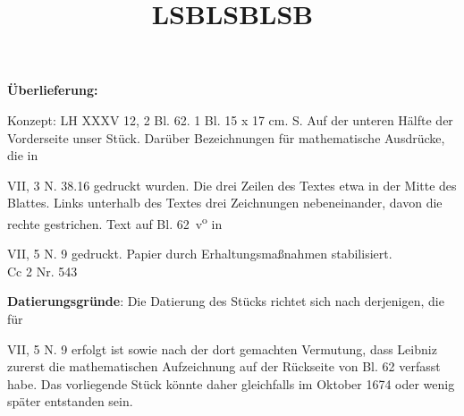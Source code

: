       
               
                \begin{ledgroupsized}[r]{120mm}
                \footnotesize 
                \pstart                
                \noindent\textbf{\"{U}berlieferung:}   
                \pend
                \end{ledgroupsized}
            
              
                            \begin{ledgroupsized}[r]{114mm}
                            \footnotesize 
                            \pstart \parindent -6mm
                            Konzept: LH XXXV 12, 2 Bl. 62. 1 Bl. 15 x 17 cm.  S. Auf der unteren H\"{a}lfte der Vorderseite unser St\"{u}ck. Dar\"{u}ber Bezeichnungen f\"{u}r mathematische Ausdr\"{u}cke, die in \cite{00115}\title{LSB} VII, 3 N. 38.16 gedruckt wurden. Die drei Zeilen des Textes etwa in der Mitte des Blattes. Links unterhalb des Textes drei Zeichnungen nebeneinander, davon die rechte gestrichen. Text auf Bl. 62~v\textsuperscript{o} in \cite{00115}\title{LSB} VII, 5 N. 9 gedruckt. Papier durch Erhaltungsma{\ss}nahmen stabilisiert.\\Cc 2 Nr. 543 \pend
                            \end{ledgroupsized}
                \vspace*{5mm}
                \begin{ledgroup}
                \footnotesize 
                \pstart
            \noindent\footnotesize{\textbf{Datierungsgr\"{u}nde}: Die Datierung des St\"{u}cks richtet sich nach derjenigen, die f\"{u}r \title[115]{LSB} VII, 5 N. 9 erfolgt ist sowie nach der dort gemachten Vermutung, dass Leibniz zurerst die mathematischen Aufzeichnung auf der R\"{u}ckseite von Bl. 62 verfasst habe. Das vorliegende St\"{u}ck k\"{o}nnte daher gleichfalls im Oktober 1674 oder wenig sp\"{a}ter entstanden sein.}
                \pend
                \end{ledgroup}
            
